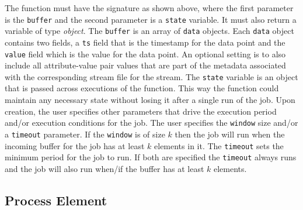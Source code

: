 The function must have the signature as shown above, where the first parameter is the \texttt{buffer} and the second parameter
is a \texttt{state} variable.  It must also return a variable of type \emph{object}.  The \texttt{buffer} is an array of \texttt{data}
objects.  Each \texttt{data} object contains two fields, a \texttt{ts} field that is the timestamp
for the data point and the \texttt{value} field which is the value for the data point.  An optional setting is to also
include all attribute-value pair values that are part of the metadata associated with the corresponding stream file for the stream.
The \texttt{state} variable is an object that is passed across executions of the function.  This way the function could maintain
any necessary state without losing it after a single run of the job.  Upon creation, the user specifies other parameters that
drive the execution period and/or execution conditions for the job.  The user specifies the \texttt{window} size and/or a
\texttt{timeout} parameter.  If the \texttt{window} is of size $k$ then the job will run when the incoming buffer for the job has
at least $k$ elements in it.  The \texttt{timeout} sets the minimum period for the job to run.  If both are specified the 
\texttt{timeout} always runs and the job will also run when/if the buffer has at least $k$ elements.

\subsection{Process Element}


